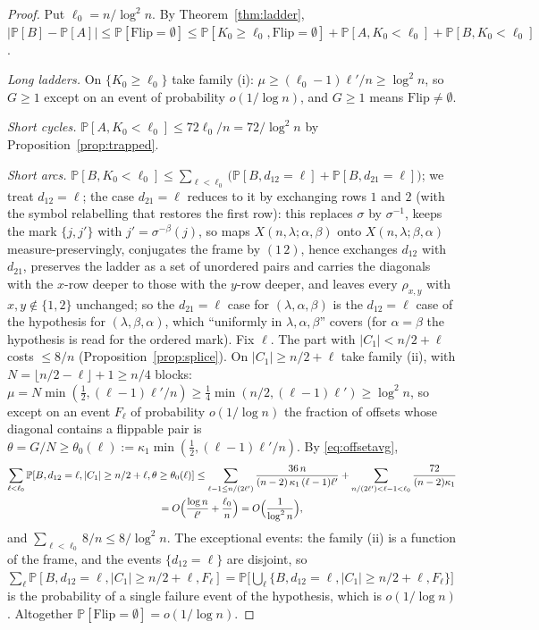 \documentclass[11pt]{article}
\theoremstyle{definition}
\renewcommand{\Pr}{\mathbb{P}}
\begin{document}
\begin{proof}
Put $\ell_0=n/\log^2n$.  By Theorem~\ref{thm:ladder},
$|\Pr[B]-\Pr[A]|\le\Pr[\mathrm{Flip}=\emptyset]\le
\Pr[K_0\ge\ell_0,\mathrm{Flip}=\emptyset]+\Pr[A,K_0<\ell_0]+\Pr[B,K_0<\ell_0]$.

\emph{Long ladders.}  On $\{K_0\ge\ell_0\}$ take family (i):
$\mu\ge(\ell_0-1)\ell'/n\ge\log^2n$, so $G\ge1$ except on an
event of probability $o(1/\log n)$, and $G\ge1$ means
$\mathrm{Flip}\ne\emptyset$.

\emph{Short cycles.}  $\Pr[A,K_0<\ell_0]\le72\ell_0/n=72/\log^2n$ by
Proposition~\ref{prop:trapped}.

\emph{Short arcs.}  $\Pr[B,K_0<\ell_0]\le\sum_{\ell<\ell_0}\bigl(\Pr[B,d_{12}=\ell]+\Pr[B,d_{21}=\ell]\bigr)$;
we treat $d_{12}=\ell$; the case $d_{21}=\ell$ reduces to it by exchanging
rows $1$ and $2$ (with the symbol relabelling that restores the first
row): this replaces $\sigma$ by $\sigma^{-1}$, keeps the mark $\{j,j'\}$
with $j'=\sigma^{-\beta}(j)$, so maps $X(n,\lambda;\alpha,\beta)$ onto
$X(n,\lambda;\beta,\alpha)$ measure-preservingly, conjugates the frame
by $(1\,2)$, hence exchanges $d_{12}$ with $d_{21}$, preserves the
ladder as a set of unordered pairs and carries the diagonals with the
$x$-row deeper to those with the $y$-row deeper, and leaves every
$\rho_{x,y}$ with $x,y\notin\{1,2\}$ unchanged; so the $d_{21}=\ell$ case
for $(\lambda,\alpha,\beta)$ is the $d_{12}=\ell$ case of the hypothesis
for $(\lambda,\beta,\alpha)$, which ``uniformly in $\lambda,\alpha,\beta$''
covers (for $\alpha=\beta$ the hypothesis is read for the ordered mark).
Fix $\ell$.  The part with $|C_1|<n/2+\ell$ costs $\le8/n$ (Proposition~\ref{prop:splice}).  On
$|C_1|\ge n/2+\ell$ take family (ii), with $N=\lfloor n/2-\ell\rfloor+1\ge n/4$
blocks: $\mu=N\min(\tfrac12,(\ell-1)\ell'/n)\ge\tfrac14\min(n/2,(\ell-1)\ell')\ge\log^2n$,
so except on an event $F_\ell$ of probability $o(1/\log n)$ the
fraction of offsets whose diagonal contains a flippable pair is
$\theta=G/N\ge\theta_0(\ell):=\kappa_1\min(\tfrac12,(\ell-1)\ell'/n)$.  By
\eqref{eq:offsetavg},
\begin{multline*}
\sum_{\ell<\ell_0}\Pr[B,d_{12}=\ell,|C_1|\ge n/2+\ell,\theta\ge\theta_0(\ell)]
\le\sum_{\ell-1\le n/(2\ell')}\frac{36\,n}{(n-2)\,\kappa_1\,(\ell-1)\ell'}
+\sum_{n/(2\ell')<\ell-1<\ell_0}\frac{72}{(n-2)\kappa_1}\\
=O\Bigl(\frac{\log n}{\ell'}+\frac{\ell_0}{n}\Bigr)=O\Bigl(\frac1{\log^2n}\Bigr),
\end{multline*}
and $\sum_{\ell<\ell_0}8/n\le8/\log^2n$.  The exceptional events: the
family (ii) is a function of the frame, and the events $\{d_{12}=\ell\}$
are disjoint, so $\sum_\ell\Pr[B,d_{12}=\ell,|C_1|\ge n/2+\ell,F_\ell]
=\Pr\bigl[\bigcup_\ell\{B,d_{12}=\ell,|C_1|\ge n/2+\ell,F_\ell\}\bigr]$ is
the probability of a single failure event of the hypothesis, which is
$o(1/\log n)$.
Altogether $\Pr[\mathrm{Flip}=\emptyset]=o(1/\log n)$.
\end{proof}
\end{document}
